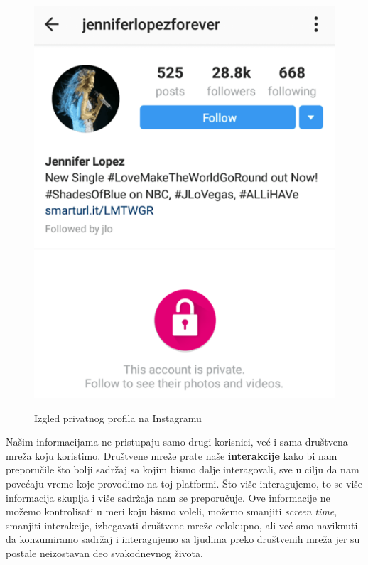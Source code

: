 \documentclass[12pt, a4paper]{article}
\begin{document}
{\begin{figure}[h!]
     \centering
     \includegraphics[scale = 0.6]{priv.png}
     \label{fig:privatni profil}
     \caption{Izgled privatnog profila na Instagramu}
 \end{figure}

Našim informacijama ne pristupaju samo drugi korisnici, već i sama društvena mreža koju koristimo. Društvene mreže prate naše \textbf{interakcije} kako bi nam preporučile što bolji sadržaj sa kojim bismo dalje interagovali, sve u cilju da nam povećaju vreme koje provodimo na toj platformi. Što više interagujemo, to se više informacija skuplja i više sadržaja nam se preporučuje. 
Ove informacije ne možemo kontrolisati u meri koju bismo voleli, možemo smanjiti \textit{screen time}, smanjiti interakcije, izbegavati društvene mreže celokupno, ali već smo naviknuti da konzumiramo sadržaj i interagujemo sa ljudima preko društvenih mreža jer su postale neizostavan deo svakodnevnog života.





}
\end{document}
